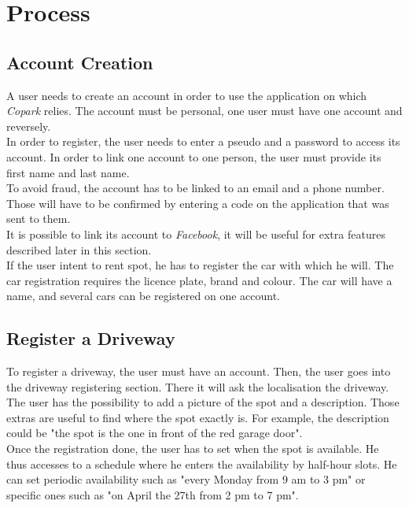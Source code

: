 \documentclass[12pt,a4paper,oneside]{book}
\newcommand{\bp}{\textit{Copark}}
\begin{document}
\section{Process}

\subsection{Account Creation}
A user needs to create an account in order to use the application on which \bp{} relies. The account must be personal, one user must have one account and reversely.\\

In order to register, the user needs to enter a pseudo and a password to access its account. In order to link one account to one person, the user must provide its first name and last name.\\

To avoid fraud, the account has to be linked to an email and a phone number. Those will have to be confirmed by entering a code on the application that was sent to them.\\

It is possible to link its account to \textit{Facebook}, it will be useful for extra features described later in this section.\\

If the user intent to rent spot, he has to register the car with which he will. The car registration requires the licence plate, brand and colour. The car will have a name, and several cars can be registered on one account.

\subsection{Register a Driveway}
To register a driveway, the user must have an account. Then, the user goes into the driveway registering section. There it will ask the localisation the driveway. The user has the possibility to add a picture of the spot and a description. Those extras are useful to find where the spot exactly is. For example, the description could be "the spot is the one in front of the red garage door".\\

Once the registration done, the user has to set when the spot is available. He thus accesses to a schedule where he enters the availability by half-hour slots. He can set periodic availability such as "every Monday from 9 am to 3 pm" or specific ones such as "on April the 27th from 2 pm to 7 pm".\\
\end{document}
